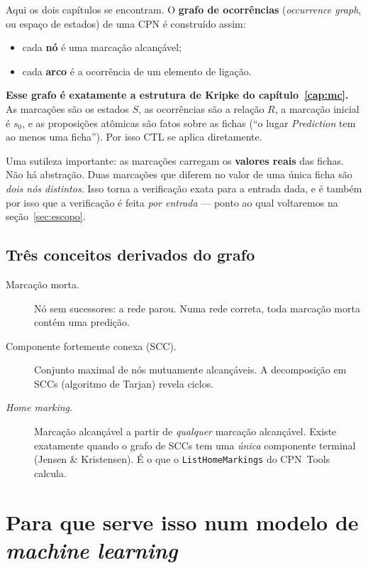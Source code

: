 \documentclass[11pt,a4paper]{report}
\newcommand{\cpntools}{CPN~Tools}
\newcommand{\code}[1]{\texttt{\small #1}}
\begin{document}
Aqui os dois capítulos se encontram. O \textbf{grafo de ocorrências}
(\emph{occurrence graph}, ou espaço de estados) de uma CPN é construído assim:

\begin{itemize}
  \item cada \textbf{nó} é uma marcação alcançável;
  \item cada \textbf{arco} é a ocorrência de um elemento de ligação.
\end{itemize}

\textbf{Esse grafo é exatamente a estrutura de Kripke do capítulo~\ref{cap:mc}.}
As marcações são os estados $S$, as ocorrências são a relação $R$, a marcação
inicial é $s_0$, e as proposições atômicas são fatos sobre as fichas (``o lugar
\emph{Prediction} tem ao menos uma ficha''). Por isso CTL se aplica diretamente.

Uma sutileza importante: as marcações carregam os \textbf{valores reais} das
fichas. Não há abstração. Duas marcações que diferem no valor de uma única
ficha são \emph{dois nós distintos}. Isso torna a verificação exata para a
entrada dada, e é também por isso que a verificação é feita \emph{por entrada}
--- ponto ao qual voltaremos na seção~\ref{sec:escopo}.

\section{Três conceitos derivados do grafo}

\begin{description}
  \item[Marcação morta.] Nó sem sucessores: a rede parou. Numa rede correta,
        toda marcação morta contém uma predição.
  \item[Componente fortemente conexa (SCC).] Conjunto maximal de nós
        mutuamente alcançáveis. A decomposição em SCCs (algoritmo de Tarjan)
        revela ciclos.
  \item[\emph{Home marking}.] Marcação alcançável a partir de \emph{qualquer}
        marcação alcançável. Existe exatamente quando o grafo de SCCs tem uma
        \emph{única} componente terminal (Jensen \& Kristensen). É o que o
        \code{ListHomeMarkings} do \cpntools{} calcula.
\end{description}

\chapter{Para que serve isso num modelo de \emph{machine learning}}
\end{document}
